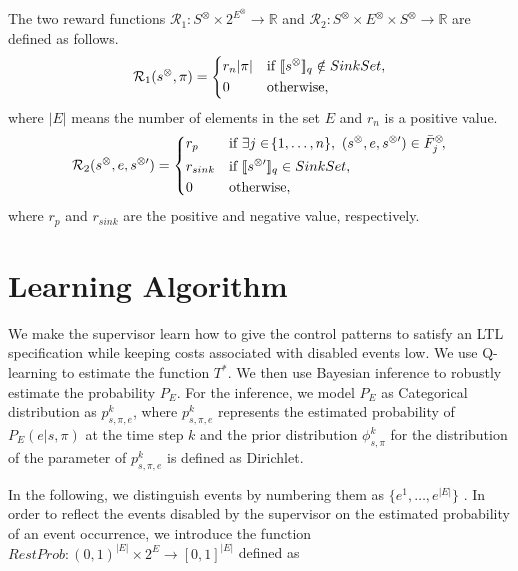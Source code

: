 \begin{definition}
  The two reward functions $\mathcal{R}_1 : S^{\otimes} \times 2^{E^{\otimes}} \rightarrow \mathbb{R}$ and $\mathcal{R}_2 : S^{\otimes} \times E^{\otimes} \times S^{\otimes} \rightarrow \mathbb{R}$ are defined as follows.
  \begin{align}
    \mathcal{R}_1 (s^{\otimes}, \pi) =
    \left\{
    \begin{aligned}
      & r_{n}|\pi| & &\text{if} \ [\![s^{\otimes}]\!]_q \notin SinkSet , \\
      & 0 & &\text{otherwise},
    \end{aligned}
    \right.
  \end{align}
  where $|E|$ means the number of elements in the set $E$ and $r_{n}$ is a positive value.
  \begin{align}
    \mathcal{R}_2(s^{\otimes}, e, s^{\otimes \prime}) =
    \left\{
    \begin{aligned}
      &r_p & & \text{if}\ \exists j \in \! \{ 1, \ldots ,n \},\ (s^{\otimes}, e, s^{\otimes \prime}) \in \bar{F}^{\otimes}_j \!,\\
      &r_{sink} & & \text{if}\ [\![s^{\otimes \prime}]\!]_q \in SinkSet,\\
      &0 & & \text{otherwise},
    \end{aligned}
    \right.
  \end{align}
  where $r_p$ and $r_{sink}$ are the positive and negative value, respectively.
  \label{reward_def}
\end{definition}

\section{Learning Algorithm}
We make the supervisor learn how to give the control patterns to satisfy an LTL specification while keeping costs associated with disabled events low. We use Q-learning to estimate the function $T^{\ast}$. We then use Bayesian inference to robustly estimate the probability $P_E$. For the inference, we model $P_E$ as Categorical distribution as $p^k_{s,\pi,e}$, where $p^k_{s,\pi,e}$ represents the estimated probability of $P_E(e|s,\pi)$ at the time step $k$ and the prior distribution $\phi^k_{s,\pi}$ for the distribution of the parameter of $p^k_{s,\pi,e}$ is defined as Dirichlet.

In the following, we distinguish events by numbering them as $\{ e^1, \ldots, e^{|E|} \}$ . In order to reflect the events disabled by the supervisor on the estimated probability of an event occurrence, we introduce the function $RestProb : (0,1)^{|E|} \times 2^E \rightarrow [0,1]^{|E|}$ defined as

